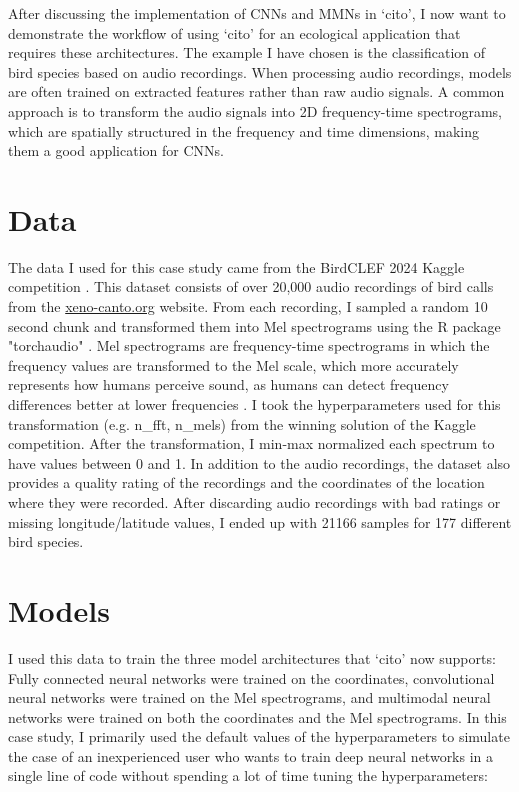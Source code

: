\documentclass[12pt,twoside]{scrreport}
\newcommand{\pkg}[1]{`#1'}
\begin{document}
\noindent After discussing the implementation of CNNs and MMNs in \pkg{cito}, I now want to demonstrate the workflow of using \pkg{cito} for an ecological application that requires these architectures. The example I have chosen is the classification of bird species based on audio recordings. When processing audio recordings, models are often trained on extracted features rather than raw audio signals. A common approach is to transform the audio signals into 2D frequency-time spectrograms, which are spatially structured in the frequency and time dimensions, making them a good application for CNNs.

\section*{Data}
The data I used for this case study came from the BirdCLEF 2024 Kaggle competition \citep{birdclef-2024}. This dataset consists of over 20,000 audio recordings of bird calls from the \url{xeno-canto.org} website. From each recording, I sampled a random 10 second chunk and transformed them into Mel spectrograms using the R package "torchaudio" \citep{keydanaTorchaudioInterfacePytorchs2023}. Mel spectrograms are frequency-time spectrograms in which the frequency values are transformed to the Mel scale, which more accurately represents how humans perceive sound, as humans can detect frequency differences better at lower frequencies \citep{stevensScaleMeasurementPsychological1937}. I took the hyperparameters used for this transformation (e.g. n\_fft, n\_mels) from the winning solution of the Kaggle competition. After the transformation, I min-max normalized each spectrum to have values between 0 and 1. In addition to the audio recordings, the dataset also provides a quality rating of the recordings and the coordinates of the location where they were recorded. After discarding audio recordings with bad ratings or missing longitude/latitude values, I ended up with 21166 samples for 177 different bird species.

\section*{Models}
I used this data to train the three model architectures that \pkg{cito} now supports: Fully connected neural networks were trained on the coordinates, convolutional neural networks were trained on the Mel spectrograms, and multimodal neural networks were trained on both the coordinates and the Mel spectrograms. In this case study, I primarily used the default values of the hyperparameters to simulate the case of an inexperienced user who wants to train deep neural networks in a single line of code without spending a lot of time tuning the hyperparameters:
\end{document}
